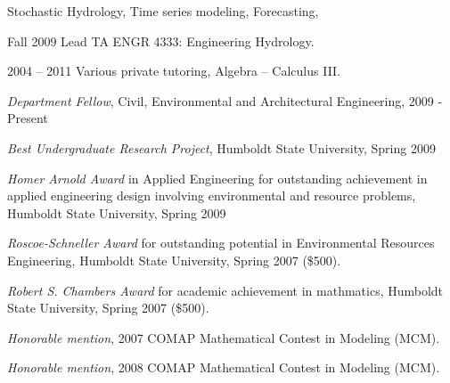 \documentclass[10pt,a4paper]{scrartcl}
\begin{document}
\begin{cv}{}
        \begin{cvlist}{}\label{interests}
            \item[] Stochastic Hydrology, Time series modeling, Forecasting, 
        \end{cvlist}
        
        \begin{cvlist}{}\label{tut}
            \item[Fall 2009] Lead TA ENGR 4333: Engineering Hydrology. 
            \item[2004 -- 2011] Various private tutoring, Algebra -- Calculus III.
        \end{cvlist}
        
        \begin{cvlist}{}\label{awards}
            \item   \textit{Department Fellow}, Civil, Environmental and Architectural Engineering, 2009 - Present
            \item   \textit{Best Undergraduate Research Project}, Humboldt State University, Spring 2009
            \item   \textit{Homer Arnold Award} in Applied Engineering for outstanding achievement in applied engineering design involving environmental and resource problems, Humboldt State University, Spring 2009 
            \item   \textit{Roscoe-Schneller Award} for outstanding potential in Environmental Resources Engineering, Humboldt State University, Spring 2007 (\$500).

	        \item \textit{Robert S. Chambers Award} for academic achievement in mathmatics, Humboldt State University, Spring 2007 (\$500).

	        \item \textit{Honorable mention}, 2007 COMAP Mathematical Contest in Modeling (MCM).
	
	        \item \textit{Honorable mention}, 2008 COMAP Mathematical Contest in Modeling (MCM).
        \end{cvlist}
        

\end{cv}
\end{document}
